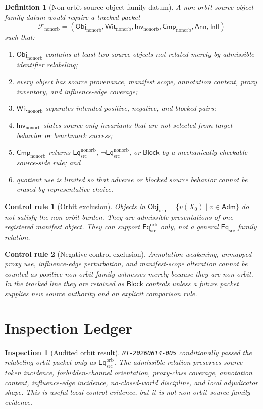 \documentclass[11pt]{article}
\newcommand{\ObjOrb}{\mathsf{Obj}_{\mathrm{orb}}}
\newcommand{\ObjNon}{\mathsf{Obj}_{\mathrm{nonorb}}}
\newcommand{\FamNon}{\mathcal{F}_{\mathrm{nonorb}}}
\newcommand{\InvNon}{\mathsf{Inv}_{\mathrm{nonorb}}}
\newcommand{\CmpNon}{\mathsf{Cmp}_{\mathrm{nonorb}}}
\newcommand{\WitNon}{\mathsf{Wit}_{\mathrm{nonorb}}}
\newcommand{\EqSrc}{\mathsf{Eq}_{\mathrm{src}}}
\newcommand{\EqOrb}{\mathsf{Eq}_{\mathrm{src}}^{\mathrm{orb}}}
\newcommand{\EqNon}{\mathsf{Eq}_{\mathrm{src}}^{\mathrm{nonorb}}}
\newcommand{\Annot}{\mathsf{Ann}}
\newcommand{\Influence}{\mathsf{Infl}}
\newcommand{\Block}{\mathsf{Block}}
\newtheorem{definitionblock}{Definition}
\newtheorem{inspection}{Inspection}
\newtheorem{controlrule}{Control rule}
\begin{document}
\begin{definitionblock}[Non-orbit source-object family datum]
A non-orbit source-object family datum would require a tracked packet
\[
    \FamNon=(\ObjNon,\WitNon,\InvNon,\CmpNon,\Annot,\Influence)
\]
such that:
\begin{enumerate}
    \item \(\ObjNon\) contains at least two source objects not related
    merely by admissible identifier relabeling;
    \item every object has source provenance, manifest scope, annotation
    content, proxy inventory, and influence-edge coverage;
    \item \(\WitNon\) separates intended positive, negative, and blocked
    pairs;
    \item \(\InvNon\) states source-only invariants that are not selected
    from target behavior or benchmark success;
    \item \(\CmpNon\) returns \(\EqNon\), \(\neg\EqNon\), or \(\Block\)
    by a mechanically checkable source-side rule; and
    \item quotient use is limited so that adverse or blocked source
    behavior cannot be erased by representative choice.
\end{enumerate}
\end{definitionblock}

\begin{controlrule}[Orbit exclusion]
Objects in \(\ObjOrb=\{v(X_{0})\mid v\in\mathsf{Adm}\}\) do not satisfy
the non-orbit burden. They are admissible presentations of one registered
manifest object. They can support \(\EqOrb\) only, not a general
\(\EqSrc\) family relation.
\end{controlrule}

\begin{controlrule}[Negative-control exclusion]
Annotation weakening, unmapped proxy use, influence-edge perturbation,
and manifest-scope alteration cannot be counted as positive non-orbit
family witnesses merely because they are non-orbit. In the tracked line
they are retained as \(\Block\) controls unless a future packet supplies
new source authority and an explicit comparison rule.
\end{controlrule}

\section{Inspection Ledger}

\begin{inspection}[Audited orbit result]
\texttt{RT-20260614-005} conditionally passed the relabeling-orbit packet
only as \(\EqOrb\). The admissible relation preserves source token
incidence, forbidden-channel orientation, proxy-class coverage,
annotation content, influence-edge incidence, no-closed-world discipline,
and local adjudicator shape. This is useful local control evidence, but
it is not non-orbit source-family evidence.
\end{inspection}
\end{document}
